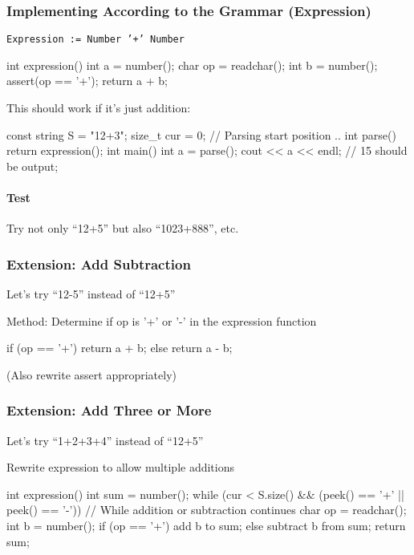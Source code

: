 \subsubsection{Implementing According to the Grammar (Expression)}
\texttt{\textcolor{ired}{Expression := Number '+' Number}}

\begin{cbox}[emph={expression},emph={[2]number}]
int expression() {
  int a = number();
  char op = readchar();
  int b = number();
  assert(op == '+');
  return a + b;
}
\end{cbox}

This should work if it's just addition:
\begin{cbox}
const string S = "12+3";
size_t cur = 0; // Parsing start position
.. 
int parse() { return expression(); }
int main() {
  int a = parse();
  cout << a << endl; // 15 should be output;
}  
\end{cbox}

\paragraph{Test}
Try not only ``12+5'' but also ``1023+888'', etc.

\subsubsection{Extension: Add Subtraction}
Let's try ``12-5'' instead of ``12+5''

Method: Determine if op is '+' or '-' in the expression function
\begin{cbox}
  if (op == '+') return a + b;
  else return a - b;  
\end{cbox}
(Also rewrite assert appropriately)

\subsubsection{Extension: Add Three or More}
Let's try ``1+2+3+4'' instead of ``12+5''

Rewrite expression to allow multiple additions
\begin{cbox}[emph={sum,while}]
int expression() {
    int sum = number();
    while (cur < S.size() && (peek() == '+' || peek() == '-')) {
        // While addition or subtraction continues
        char op = readchar();
        int b = number();
        if (op == '+') add b to sum;
        else subtract b from sum;
    }
    return sum;
}
\end{cbox}


